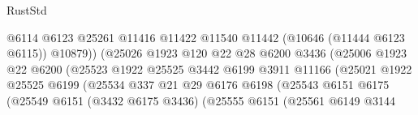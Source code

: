 \begin{lexlean}{RustStd}
\begin{coremodule}
                                            @6114
                                            @6123
                                            @25261
                                            @11416
                                            @11422
                                            @11540
                                            @11442
                                            (@10646 (@11444 @6123 @6115))
                                            @10879))
                                        (@25026
                                          @1923
                                          @120
                                          @22
                                          @28
                                          @6200
                                          @3436
                                          (@25006
                                            @1923
                                            @22
                                            @6200
                                            (@25523
                                              @1922
                                              @25525
                                              @3442
                                              @6199
                                              @3911
                                              @11166
                                              (@25021
                                                @1922
                                                @25525
                                                @6199
                                                (@25534
                                                  @337
                                                  @21
                                                  @29
                                                  @6176
                                                  @6198
                                                  (@25543
                                                    @6151
                                                    @6175
                                                    (@25549
                                                      @6151
                                                      (@3432 @6175 @3436)
                                                      (@25555
                                                        @6151
                                                        (@25561
                                                          @6149
                                                          @3144

\end{coremodule}
\end{lexlean}
